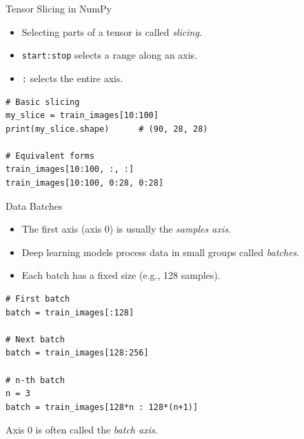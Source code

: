 \documentclass{beamer}
\begin{document}
\begin{frame}[fragile]{Tensor Slicing in NumPy}
    \begin{itemize}
        \item Selecting parts of a tensor is called \textit{slicing}.
        \item \texttt{start:stop} selects a range along an axis.
        \item \texttt{:} selects the entire axis.
    \end{itemize}

    \begin{center}
        \begin{tcolorbox}[
                width=0.75\textwidth,
                colback=gray!5,
                colframe=gray!60,
                boxrule=0.4pt,
                arc=3pt,
                left=6pt,right=6pt,top=6pt,bottom=6pt
            ]
            \begin{verbatim}
# Basic slicing
my_slice = train_images[10:100]
print(my_slice.shape)      # (90, 28, 28)

# Equivalent forms
train_images[10:100, :, :]
train_images[10:100, 0:28, 0:28]
\end{verbatim}
        \end{tcolorbox}
    \end{center}

\end{frame}

\begin{frame}[fragile]{Data Batches}
    \begin{itemize}
        \item The first axis (axis 0) is usually the \textit{samples axis}.
        \item Deep learning models process data in small groups called \textit{batches}.
        \item Each batch has a fixed size (e.g., 128 samples).
    \end{itemize}

    \begin{center}
        \begin{tcolorbox}[
                width=0.75\textwidth,
                colback=gray!5,
                colframe=gray!60,
                boxrule=0.4pt,
                arc=3pt,
                left=6pt,right=6pt,top=6pt,bottom=6pt
            ]
            \begin{verbatim}
# First batch
batch = train_images[:128]

# Next batch
batch = train_images[128:256]

# n-th batch
n = 3
batch = train_images[128*n : 128*(n+1)]
\end{verbatim}
        \end{tcolorbox}
    \end{center}

    \vspace{0.5em}
    \small Axis 0 is often called the \textit{batch axis}.
\end{frame}
\end{document}
